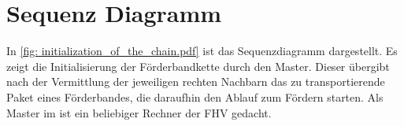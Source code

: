\documentclass[./\jobname.tex]{subfiles}
\begin{document}
\section{Sequenz Diagramm}
%
In \autoref{fig: initialization_of_the_chain.pdf} ist das Sequenzdiagramm dargestellt. Es zeigt die Initialisierung der Förderbandkette durch den Master.
Dieser übergibt nach der Vermittlung der jeweiligen rechten Nachbarn das zu transportierende Paket eines Förderbandes, die daraufhin den Ablauf zum Fördern starten. Als Master im \modeB ist ein beliebiger Rechner der FHV gedacht.
%
\begin{figure}[H]
	\centering
	\noindent{}
	\label{fig: initialization_of_the_chain.pdf}
\end{figure}
%
\end{document}
